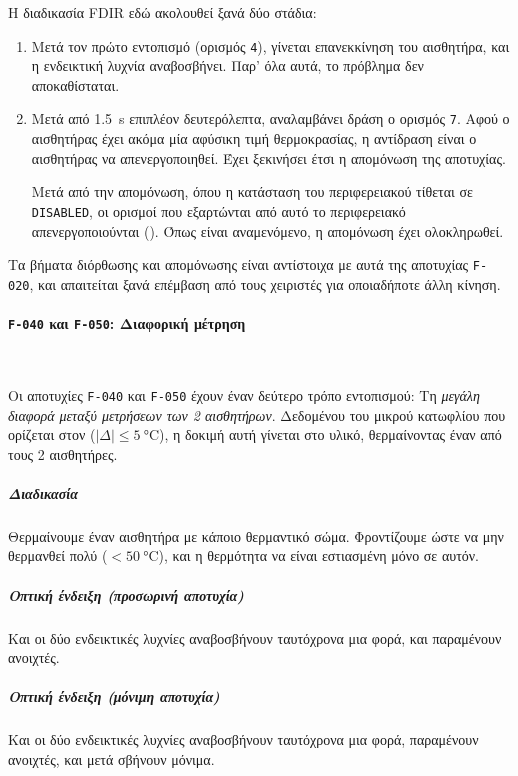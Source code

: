 \documentclass[a4paper,nobib]{tufte-book}
\begin{document}
Η διαδικασία \acs{FDIR} εδώ ακολουθεί ξανά δύο στάδια:
\begin{enumerate}
	\item Μετά τον πρώτο εντοπισμό (ορισμός \texttt{4}), γίνεται επανεκκίνηση του αισθητήρα, και η ενδεικτική λυχνία αναβοσβήνει. Παρ' όλα αυτά, το πρόβλημα δεν αποκαθίσταται.
	\item Μετά από \SI{1.5}{\second} επιπλέον δευτερόλεπτα, αναλαμβάνει δράση ο ορισμός \texttt{7}. Αφού ο αισθητήρας έχει ακόμα μία αφύσικη τιμή θερμοκρασίας, η αντίδραση είναι ο αισθητήρας να απενεργοποιηθεί. Έχει ξεκινήσει έτσι η απομόνωση της αποτυχίας.
	
	Μετά από την απομόνωση, όπου η κατάσταση του περιφερειακού τίθεται σε \texttt{DISABLED}, οι ορισμοί που εξαρτώνται από αυτό το περιφερειακό απενεργοποιούνται (\invalid). Όπως είναι αναμενόμενο, η απομόνωση έχει ολοκληρωθεί.
\end{enumerate}

Τα βήματα διόρθωσης και απομόνωσης είναι αντίστοιχα με αυτά της αποτυχίας \texttt{F-020}, και απαιτείται ξανά επέμβαση από τους χειριστές για οποιαδήποτε άλλη κίνηση.

\clearpage
\paragraph{\textbf{\texttt{F-040} και \texttt{F-050}: Διαφορική μέτρηση}}~

Οι αποτυχίες \texttt{F-040} και \texttt{F-050} έχουν έναν δεύτερο τρόπο εντοπισμού: Τη \emph{μεγάλη διαφορά μεταξύ μετρήσεων των 2 αισθητήρων}. Δεδομένου του μικρού κατωφλίου που ορίζεται στον  (\(|Δ| \leq \SI{5}{\celsius} \)), η δοκιμή αυτή γίνεται στο υλικό, θερμαίνοντας έναν από τους 2 αισθητήρες.

\subparagraph{Διαδικασία}
\begin{compactenum}
	\item Θερμαίνουμε έναν αισθητήρα με κάποιο θερμαντικό σώμα. Φροντίζουμε ώστε να μην θερμανθεί πολύ (\(<\SI{50}{\celsius}\)), και η θερμότητα να είναι εστιασμένη μόνο σε αυτόν.
\end{compactenum}

\subparagraph{Οπτική ένδειξη (προσωρινή αποτυχία)} Και οι δύο ενδεικτικές λυχνίες αναβοσβήνουν ταυτόχρονα μια φορά, και παραμένουν ανοιχτές.

\subparagraph{Οπτική ένδειξη (μόνιμη αποτυχία)} Και οι δύο ενδεικτικές λυχνίες αναβοσβήνουν ταυτόχρονα μια φορά, παραμένουν ανοιχτές, και μετά σβήνουν μόνιμα.
\end{document}
